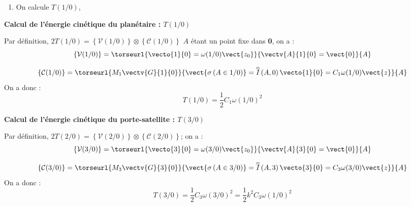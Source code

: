 


\ifprof
\begin{corrige}
\begin{methode}
\begin{enumerate}
\item On calcule $T(1/0)$, 
\end{enumerate}
\end{methode}
\textbf{Calcul de l'énergie cinétique du planétaire : $T(1/0)$}

Par définition, 
$2T(1/0)=\left\{\mathcal{V}(1/0) \right\} \otimes \left\{\mathcal{C}(1/0) \right\} $
$A$ étant un point fixe dans \textbf{0}, on a : 
$$
\left\{\mathcal{V}(1/0) \right\} = \torseurl{\vecto{1}{0}=\omega(1/0)\vect{z_0}}{\vectv{A}{1}{0}=\vect{0}}{A}$$

$$
\left\{\mathcal{C}(1/0) \right\} 
= \torseurl{M_1\vectv{G}{1}{0}}{\vect{\sigma \left( A\in 1/0\right)}=\overline{\overline{I}}\left( A,0\right) \vecto{1}{0}=C_1\omega(1/0)\vect{z}}{A}
$$
On a donc : 
$$T(1/0)=\dfrac{1}{2} C_1 \omega(1/0)^2 $$

\end{corrige}

\begin{corrige}
\textbf{Calcul de l'énergie cinétique du porte-satellite : $T(3/0)$}

Par définition, 
$2T(2/0)=\left\{\mathcal{V}(2/0) \right\} \otimes \left\{\mathcal{C}(2/0) \right\} $; on a : 
$$
\left\{\mathcal{V}(3/0) \right\} = \torseurl{\vecto{3}{0}=\omega(3/0)\vect{z_0}}{\vectv{A}{3}{0}=\vect{0}}{A}
$$

$$
\left\{\mathcal{C}(3/0) \right\} 
= \torseurl{M_3\vectv{G}{3}{0}}{\vect{\sigma \left( A\in 3/0\right)}=\overline{\overline{I}}\left( A,3\right) \vecto{3}{0}=C_3\omega(3/0)\vect{z}}{A}
$$
On a donc : 
$$T(3/0)=\dfrac{1}{2} C_3 \omega(3/0)^2=\dfrac{1}{2} k^2 C_3 \omega(1/0)^2 $$


\end{corrige}

